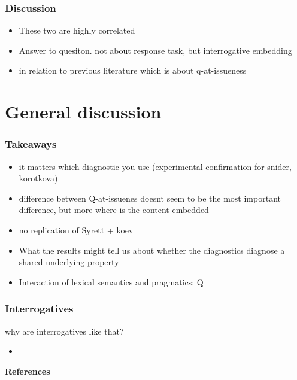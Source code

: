 \documentclass[compress, xcolor = dvipsnames, aspectratio=169]{beamer}
\begin{document}
	\begin{frame}[t]\frametitle{Discussion}
		
		\begin{itemize}
			\item These two are highly correlated 
			\item Answer to quesiton. not about response task, but interrogative embedding
			\item in relation to previous literature which is about q-at-issueness

			
		\end{itemize}

	\end{frame}	

\section{General discussion}
	
	\begin{frame}[t]\frametitle{Takeaways}
	
		\begin{itemize}
			\item it matters which diagnostic you use (experimental confirmation for snider, korotkova)
			\item difference between Q-at-issuenes doesnt seem to be the most important difference, but more where is the content embedded 
			\item no replication of Syrett + koev
			\item What the results might tell us about whether the diagnostics diagnose a shared underlying property
			\item Interaction of lexical semantics and pragmatics: Q
		\end{itemize}
	
	\end{frame}

	\begin{frame}[t]\frametitle{Interrogatives}
	
		why are interrogatives like that?

		\begin{itemize}
			\item 
		\end{itemize}
	
	\end{frame}

\begin{frame}[allowframebreaks]{\bfseries\opt References}
	\footnotesize
	
	

\end{frame}
\end{document}
